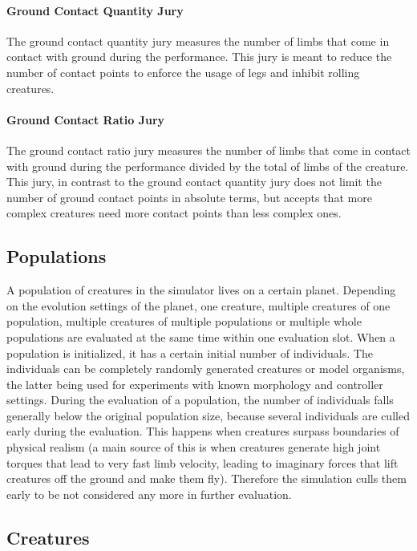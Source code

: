 \documentclass[main]{subfiles}
\begin{document}
\paragraph{Ground Contact Quantity Jury} The ground contact quantity jury measures the number of limbs that come in contact with ground during the performance. %
%
This jury is meant to reduce the number of contact points to enforce the usage of legs and inhibit rolling creatures.

\paragraph{Ground Contact Ratio Jury} The ground contact ratio jury measures the number of limbs that come in contact with ground during the performance divided by the total of limbs of the creature. %
%
This jury, in contrast to the ground contact quantity jury does not limit the number of ground contact points in absolute terms, but accepts that more complex creatures need more contact points than less complex ones.

\subsection{Populations}
\label{subsec:populations}

A population of creatures in the simulator lives on a certain planet. %
%
Depending on the evolution settings of the planet, one creature, multiple creatures of one population, multiple creatures of multiple populations or multiple whole populations are evaluated at the same time within one evaluation slot. %
%
When a population is initialized, it has a certain initial number of individuals. %
%
The individuals can be completely randomly generated creatures or model organisms, the latter being used for experiments with known morphology and controller settings. %
%
During the evaluation of a population, the number of individuals falls generally below the original population size, because several individuals are culled early during the evaluation. %
%
This happens when creatures surpass boundaries of physical realism (a main source of this is when creatures generate high joint torques that lead to very fast limb velocity, leading to imaginary forces that lift creatures off the ground and make them fly). %
%
Therefore the simulation culls them early to be not considered any more in further evaluation.

\subsection{Creatures}
\label{subsec:creatures}
\end{document}
